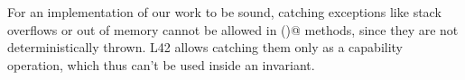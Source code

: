 




For an implementation of our work to be sound, catching exceptions like stack overflows or out of memory
cannot be allowed in \Q@invariant()@ methods, since they are not deterministically thrown.
L42 allows catching them only as a capability operation, which thus can't be used inside an invariant.


